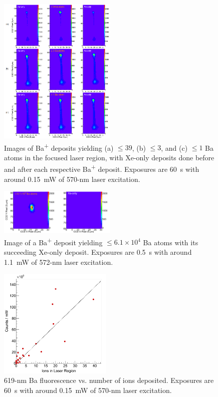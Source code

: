 \documentclass[aps,pra,reprint,superscriptaddress]{revtex4-1}
\begin{document}
\begin{figure}
\includegraphics[width=0.5\textwidth]{figures/xebaxe_instantaneous_scrunched.png}
\caption{Images of Ba\textsuperscript{+} deposits yielding (a) $\leq 39$, (b) $\leq 3$, and (c) $\leq 1$ Ba atoms in the focused laser region, with Xe-only deposits done before and after each respective Ba\textsuperscript{+} deposit.  Exposures are 60~s with around 0.15~mW of 570-nm laser excitation.}
\label{fig:XeBaXe}
\end{figure}

\begin{figure}
\includegraphics[width=0.5\textwidth]{figures/xebaxe_largest_instantaneous.png}
\caption{Image of a Ba\textsuperscript{+} deposit yielding $\leq 6.1 \times 10^4$ Ba atoms with its succeeding Xe-only deposit.  Exposures are 0.5~s with around 1.1~mW of 572-nm laser excitation.}
\label{fig:XeBaXeLarge}
\end{figure}

\begin{figure}
\includegraphics[width=0.48\textwidth]{figures/lin_just20150807_lin.png}
\caption{619-nm Ba fluorescence vs. number of ions deposited.  Exposures are 60~s with around 0.15~mW of 570-nm laser excitation.}
\label{fig:ctsVsIons}
\end{figure}
\end{document}
